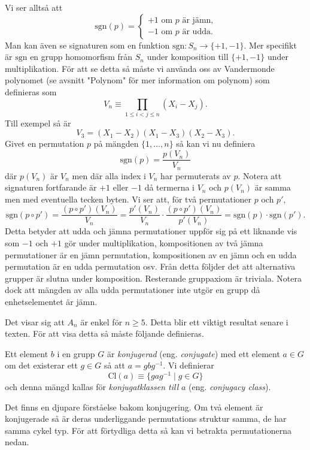 \documentclass{article}
\theoremstyle{definition}
\begin{document}
Vi ser alltså att 
\[\text{sgn}(p) = 
\begin{cases}
  +1 \text{ om } p \text{ är jämn,} \\
  -1 \text{ om } p \text{ är udda.}
\end{cases}
\]
Man kan även se signaturen som en funktion $\text{sgn}: S_n \rightarrow \{+1, -1\}$. Mer specifikt är $\text{sgn}$ en grupp homomorfism 
från $S_n$ under komposition till $\{+1, -1\}$ under multiplikation. För att se detta så måste vi använda oss av Vandermonde polynomet (se 
avsnitt "Polynom" för mer information om polynom) som definieras som
\[V_n \equiv \prod_{1 \leq i < j \leq n} (X_i - X_j).\]
Till exempel så är 
\[V_3 = (X_1 - X_2)(X_1 - X_3)(X_2 - X_3).\]
Givet en permutation $p$ på mängden $\{1, \ldots, n\}$ så kan vi nu definiera 
\[\text{sgn}(p) = \frac{p(V_n)}{V_n}\]
där $p(V_n)$ är $V_n$ men där alla index i $V_n$ har permuterats av $p$.
Notera att signaturen fortfarande är $+1$ eller $-1$ då termerna i $V_n$ och $p(V_n)$ är samma men med eventuella tecken byten. 
Vi ser att, för två permutationer $p$ och $p'$,
\[\text{sgn}(p \circ p') = \frac{ (p \circ p')(V_n) }{V_n} = \frac{p'(V_n)}{V_n} \cdot \frac{(p \circ p')(V_n)}{p'(V_n)} = \text{sgn}(p) \cdot \text{sgn}(p').\]
Detta betyder att udda och jämna permutationer uppför sig på ett liknande vis som $-1$ och $+1$ gör under multiplikation, kompositionen av två jämna permutationer 
är en jämn permutation, kompositionen av en jämn och en udda permutation är en udda permutation osv. 
Från detta följder det att alternativa grupper är slutna under komposition. 
Resterande gruppaxiom är triviala. Notera dock att mängden av alla udda permutationer inte utgör en grupp då enhetselementet 
är jämn. 

Det visar sig att $A_n$ är enkel för $n \geq 5$. Detta blir ett viktigt resultat senare i texten. För att visa detta så måste följande definieras. 
\begin{mydef}{}{}
  Ett element $b$ i en grupp $G$ är \textit{konjugerad} (eng. \textit{conjugate}) med ett element $a \in G$ om det existerar ett $g \in G$ 
  så att $a = gbg^{-1}.$ Vi definierar 
  \[\text{Cl}(a) \equiv \{gag^{-1} \; | \; g \in G\}\]
  och denna mängd kallas för \textit{konjugatklassen till} $a$ (eng. \textit{conjugacy class}).
\end{mydef}

Det finns en djupare förståelse bakom konjugering. Om två element är konjugerade så är deras underliggande permutations struktur samma, 
de har samma cykel typ. För att förtydliga detta så kan vi betrakta permutationerna nedan.
\end{document}

